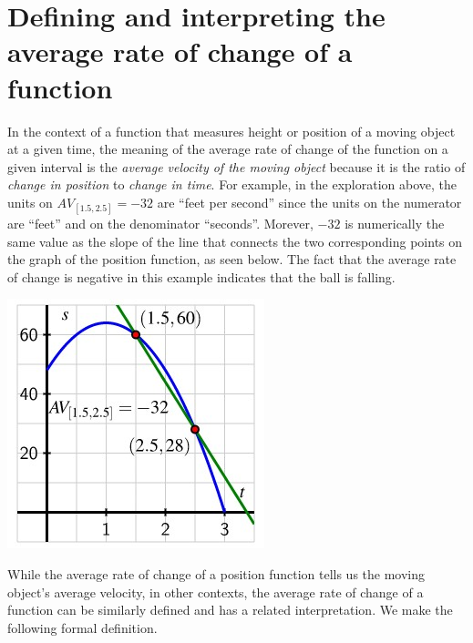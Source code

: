 \documentclass[nooutcomes]{ximera}
\begin{document}
\section{Defining and interpreting the average rate of change of a function}

In the context of a function that measures height or position of a moving object at a given time, the meaning of the average rate of change of the function on a given interval is the \emph{average velocity of the moving object} because it is the ratio of \emph{change in position} to \emph{change in time}.  For example, in the exploration above, the units on \(AV_{[1.5,2.5]} = -32\) are ``feet per second'' since the units on the numerator are ``feet'' and on the denominator ``seconds''.  Morever, \(-32\) is numerically the same value as the slope of the line that connects the two corresponding points on the graph of the position function, as seen below.  The fact that the average rate of change is negative in this example indicates that the ball is falling.

\begin{image}
\includegraphics{ARoCtext2.jpg}
\end{image}

While the average rate of change of a position function tells us the moving object's average velocity, in other contexts, the average rate of change of a function can be similarly defined and has a related interpretation.  We make the following formal definition.
\end{document}
